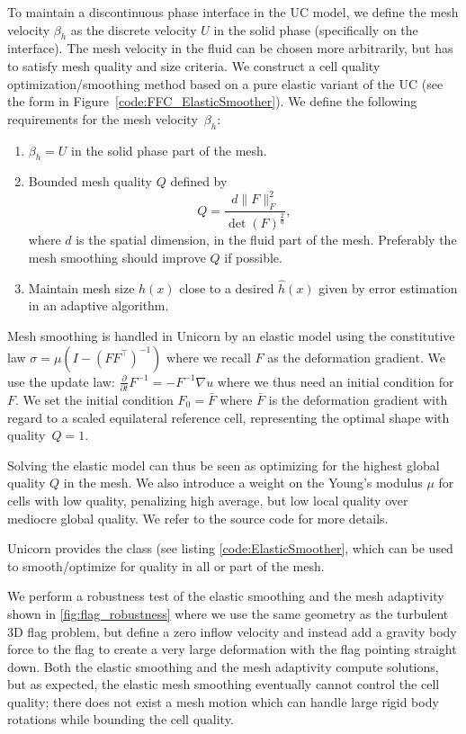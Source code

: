 To maintain a discontinuous phase interface in the UC model, we define
the mesh velocity $\beta_h$ as the discrete velocity $U$ in the solid
phase (specifically on the interface). The mesh velocity in the fluid
can be chosen more arbitrarily, but has to satisfy mesh quality and
size criteria. We construct a cell quality optimization/smoothing
method based on a pure elastic variant of the UC (see the form in
Figure~\ref{code:FFC_ElasticSmoother}). We define the following
requirements for the mesh velocity~$\beta_h$:
\begin{enumerate}
\item $\beta_h = U$ in the solid phase part of the mesh.
\item Bounded mesh quality $Q$ defined by $$Q = \frac{d \| F
  \|_F^2}{\det(F)^{\frac{2}{d}}},$$ where $d$ is the spatial dimension, in
  the fluid part of the mesh. Preferably the mesh smoothing should
  improve $Q$ if possible.
\item Maintain mesh size $h(x)$ close to a desired $\hat{h}(x)$ given
  by \apost{} error estimation in an adaptive algorithm.
\end{enumerate}
Mesh smoothing is handled in Unicorn by an elastic model using the
constitutive law $\sigma = \mu(I - (FF^\top)^{-1})$ where we recall
$F$ as the deformation gradient. We use the update law:
$\frac{\partial}{\partial t} F^{-1} = -F^{-1} \nabla u$ where we thus
need an initial condition for $F$. We set the initial condition $F_0 =
\bar{F}$ where $\bar{F}$ is the deformation gradient with regard to a
scaled equilateral reference cell, representing the optimal shape with
quality~$Q = 1$.

Solving the elastic model can thus be seen as optimizing for the
highest global quality $Q$ in the mesh. We also introduce a weight on
the Young's modulus $\mu$ for cells with low quality, penalizing high
average, but low local quality over mediocre global quality. We refer
to the source code for more details.

Unicorn provides the  class (see listing
\ref{code:ElasticSmoother}, which can be used to smooth/optimize for
quality in all or part of the mesh.

We perform a robustness test of the elastic smoothing and the mesh
adaptivity shown in \ref{fig:flag_robustness} where we use the same
geometry as the turbulent 3D flag problem, but define a zero inflow
velocity and instead add a gravity body force to the flag to create a
very large deformation with the flag pointing straight down. Both the
elastic smoothing and the mesh adaptivity compute solutions, but as
expected, the elastic mesh smoothing eventually cannot control the
cell quality; there does not exist a mesh motion which can handle
large rigid body rotations while bounding the cell quality.

